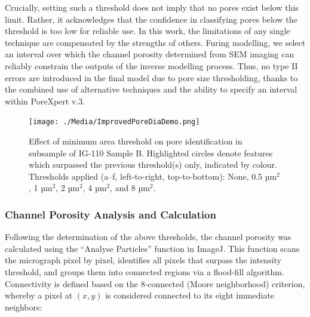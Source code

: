 \documentclass[3p,twocolumn]{elsarticle}
\begin{document}
   Crucially, setting such a threshold does not imply that no pores exist below
   this limit. Rather, it acknowledges that the confidence in classifying pores
   below the threshold is too low for reliable use. In this work, the
   limitations of any single technique are compensated by the strengths of
   others. Furing modelling, we select an interval over which the channel
   porosity determined from SEM imaging can reliably constrain the outputs of
   the inverse modelling process. Thus, no type II errors are introduced in the
   final model due to pore size thresholding, thanks to the combined use of
   alternative techniques and the ability to specify an interval within
   PoreXpert v.3.

   \begin{table}
  \centering
  \caption{Effect of different pore area thresholds on IG-430F, showing the resulting pore count, total area, average pore size, and percentage area.}
  \label{tab:thresholdsandvariationsIG430F}
\end{table}

\begin{figure}[!htbp]
    \centering
    \texttt{[image: ./Media/ImprovedPoreDiaDemo.png]}
    \caption{Effect of minimum area threshold on pore identification in subsample of IG-110 Sample B. Highlighted circles denote features which surpassed the previous threshold(s) only, indicated by colour. Thresholds applied (a–f, left-to-right, top-to-bottom): None, 0.5 µm\(^2\), 1 µm\(^2\), 2 µm\(^2\), 4 µm\(^2\), and 8 µm\(^2\).}
    \label{fig:improvedporediademo}
\end{figure}

\subsubsection{Channel Porosity Analysis and Calculation}
Following the determination of the above thresholds, the channel porosity was
calculated using the “Analyse Particles” function in ImageJ. This function scans
the micrograph pixel by pixel, identifies all pixels that surpass the intensity
threshold, and groups them into connected regions via a flood-fill algorithm.
Connectivity is defined based on the 8-connected (Moore neighborhood) criterion,
whereby a pixel at $(x,y)$ is considered connected to its eight immediate
neighbors:
\end{document}
